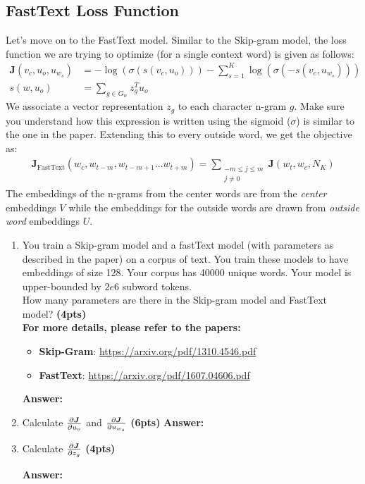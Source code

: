 \documentclass{assignment format}
\newenvironment{answer}{
    {\bf Answer:} \begingroup\color{red}
}{\endgroup}%
\begin{document}
\subsection{FastText Loss Function}
Let's move on to the FastText model.
Similar to the Skip-gram model, the loss function we are trying to optimize (for a single context word) is given as follows:
\begin{align*}
    \bm J(v_c, u_o, u_{w_s}) &= - \log(\sigma(s(v_c, u_o)))  - \sum_{s=1}^K \log(\sigma(-s(v_c, u_{w_s}))) \\
    s(w, u_o) &= \sum_{g \in G_w} z_g^T u_o
\end{align*}
We associate a vector representation $z_g$ to each character n-gram $g$. 
Make sure you understand how this expression is written using the sigmoid ($\sigma$) is similar to the one in the paper. 
Extending this to every outside word, we get the objective as:
\begin{align*}
    \bm J_{\text{FastText}}(w_c, w_{t-m}, w_{t-m+1} \dots w_{t+m}) = \sum_{\substack{-m\le j \le m \\ j\ne 0}} \bm J(w_t, w_c, N_K)
\end{align*}
The embeddings of the n-grams from the center words are from the  \textit{center} embeddings $V$ while the embeddings for the outside words are drawn from  \textit{outside word} embeddings $U$. 

\begin{enumerate}[label=(\alph*)]
    \item You train a Skip-gram model and a fastText model (with parameters as described in the paper) on a corpus of text. You train these models to have embeddings of size 128. Your corpus has 40000 unique words. Your model is upper-bounded by $2e6$ subword tokens. \\
    How many parameters are there in the Skip-gram model and FastText model? \textbf{(4pts)}\\ 
    \textbf{For more details, please refer to the papers:}
    \begin{itemize} 
\item \textbf{Skip-Gram}: \url{https://arxiv.org/pdf/1310.4546.pdf}
\item \textbf{FastText}: \url{https://arxiv.org/pdf/1607.04606.pdf}
\end{itemize} 
\begin{answer}
\end{answer}
    \item Calculate $\pdv{\bm J}{u_o}$  and $\pdv{\bm J}{u_{w_s}}$
    \textbf{(6pts)}
    \newline
\begin{answer}
\end{answer}
    \item Calculate  $\pdv{\bm J}{z_g}$
\textbf{(4pts)}%
    
\begin{answer}
    \end{answer}
    
\end{enumerate}
\end{document}
